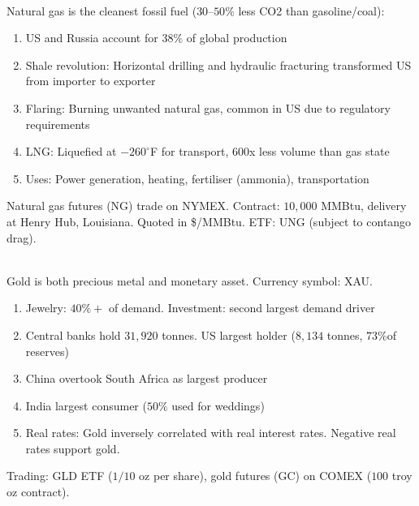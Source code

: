 \begin{remark} \\
Natural gas is the cleanest fossil fuel ($30$--$50\%$ less CO2 than gasoline/coal):
\begin{enumerate}[label=\roman*.]
\setlength{\itemsep}{0pt}
\item US and Russia account for $38\%$ of global production
\item Shale revolution: Horizontal drilling and hydraulic fracturing transformed US from importer to exporter
\item Flaring: Burning unwanted natural gas, common in US due to regulatory requirements
\item LNG: Liquefied at $-260^\circ$F for transport, 600x less volume than gas state
\item Uses: Power generation, heating, fertiliser (ammonia), transportation
\end{enumerate}
Natural gas futures (NG) trade on NYMEX. Contract: $10,000$ MMBtu, delivery at Henry Hub, Louisiana. Quoted in \$/MMBtu. ETF: UNG (subject to contango drag).
\end{remark}

\begin{remark} \\
Gold is both precious metal and monetary asset. Currency symbol: XAU.
\begin{enumerate}[label=\roman*.]
\setlength{\itemsep}{0pt}
\item Jewelry: $40\%+$ of demand. Investment: second largest demand driver
\item Central banks hold $31,920$ tonnes. US largest holder ($8,134$ tonnes, $73\% $of reserves)
\item China overtook South Africa as largest producer
\item India largest consumer ($50\%$ used for weddings)
\item Real rates: Gold inversely correlated with real interest rates. Negative real rates support gold.
\end{enumerate}
Trading: GLD ETF ($1/10$ oz per share), gold futures (GC) on COMEX ($100$ troy oz contract).
\end{remark}

